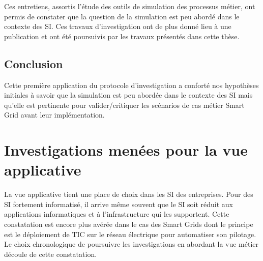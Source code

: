 			Ces entretiens, assortis l'étude des outils de simulation des processus 
métier, ont permis de constater que la question de la simulation est peu abordé 
dans le contexte des SI. Ces travaux d'investigation ont de plus donné lieu à 
une publication \cite{seghiri2012animation} et ont été poursuivis par les 
travaux présentés dans cette thèse.
 
				\subsection{Conclusion}
			Cette première application du protocole d'investigation a conforté nos hypothèses initiales à savoir que la simulation est peu abordée dans le contexte des SI mais qu'elle est pertinente pour valider/critiquer les scénarios de cas métier Smart Grid avant leur implémentation.

			\section{Investigations menées pour la vue applicative} 
			\label{sec:investig_appli}
				La vue applicative tient une place de choix dans les SI des entreprises. Pour des SI fortement informatisé, il arrive même souvent que le SI soit réduit aux applications informatiques et à l'infrastructure qui les supportent. Cette constatation est encore plus avérée dans le cas des Smart Grids dont le principe est le déploiement de TIC sur le réseau électrique pour automatiser son pilotage. Le choix chronologique de poursuivre les investigations en abordant la vue métier découle de cette constatation.		
			
